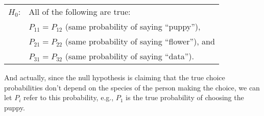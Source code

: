 \smallskip
\begin{tabular}{ll}
$H_0$: \hspace*{0.5cm} & All of the following are true: \\ 
    & $P_{11} = P_{12}$ (same probability of saying ``puppy''), \\ 
	& $P_{21} = P_{22}$ (same probability of saying ``flower''), and\\ 
	& $P_{31} = P_{32}$ (same probability of saying ``data'').\\ 
\end{tabular} 
\smallskip

\noindent
And actually, since the null hypothesis is claiming that the true choice probabilities don't depend on the species of the person making the choice, we can let $P_i$ refer to this probability, e.g., $P_1$ is the true probability of choosing the puppy.

